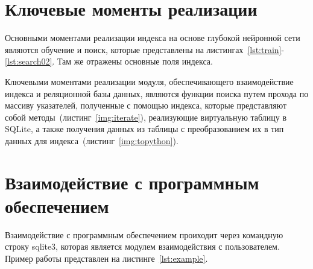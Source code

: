 \section{Ключевые моменты реализации}

Основными моментами реализации индекса на основе глубокой нейронной сети
являются обучение и поиск, которые представлены на
листингах~\ref{lst:train}-\ref{lst:search02}. Там же отражены основные поля
индекса.

{
\captionsetup{format=hang,justification=raggedright,
              singlelinecheck=off,width=16cm}
}

{
\captionsetup{format=hang,justification=raggedright,
              singlelinecheck=off,width=16cm}
}

{
\captionsetup{format=hang,justification=raggedright,
              singlelinecheck=off,width=16cm}
}

Ключевыми моментами реализации модуля, обеспечивающего взаимодействие индекса и
реляционной базы данных, являются функции поиска путем прохода по массиву
указателей, полученные с помощью индекса, которые представляют собой
методы~(листинг~\ref{img:iterate}), реализующие виртуальную таблицу в SQLite, а
также получения данных из таблицы с преобразованием их в тип данных для
индекса~(листинг~\ref{img:topython}).

{
\captionsetup{format=hang,justification=raggedright,
              singlelinecheck=off,width=16cm}
}

{
\captionsetup{format=hang,justification=raggedright,
              singlelinecheck=off,width=16cm}
}

\section{Взаимодействие с программным обеспечением}

Взаимодействие с программным обеспечением проиходит через командную строку
sqlite3, которая является модулем взаимодействия с пользователем. Пример работы
представлен на листинге~\ref{lst:example}.

{
\captionsetup{format=hang,justification=raggedright,
              singlelinecheck=off,width=16cm}
}

~\\
~\\
~\\
~\\
~\\
~\\
~\\
~\\
~\\
~\\
~\\
~\\
